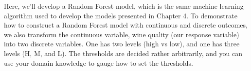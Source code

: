 \documentclass[
]{book}
\newenvironment{Shaded}{\begin{snugshade}}{\end{snugshade}}
\newcommand{\AttributeTok}[1]{\textcolor[rgb]{0.13,0.29,0.53}{#1}}
\newcommand{\CommentTok}[1]{\textcolor[rgb]{0.56,0.35,0.01}{\textit{#1}}}
\newcommand{\FunctionTok}[1]{\textcolor[rgb]{0.13,0.29,0.53}{\textbf{#1}}}
\newcommand{\NormalTok}[1]{#1}
\newcommand{\OtherTok}[1]{\textcolor[rgb]{0.56,0.35,0.01}{#1}}
\newcommand{\SpecialCharTok}[1]{\textcolor[rgb]{0.81,0.36,0.00}{\textbf{#1}}}
\newcommand{\StringTok}[1]{\textcolor[rgb]{0.31,0.60,0.02}{#1}}
\begin{document}
\begin{Shaded}
\end{Shaded}

Here, we'll develop a Random Forest model, which is the same machine learning algorithm used to develop the models presented in Chapter 4. To demonstrate how to construct a Random Forest model with continuous and discrete outcomes, we also transform the continuous variable, wine quality (our response variable) into two discrete variables. One has two levels (high vs low), and one has three levels (H, M, and L). The thresholds are decided rather arbitrarily, and you can use your domain knowledge to gauge how to set the thresholds.
\end{document}
